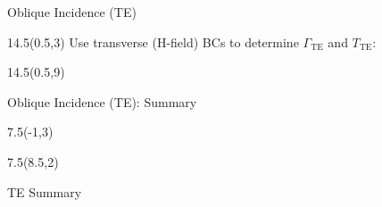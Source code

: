 \begin{frame}{Oblique Incidence (TE)}
\begin{textblock}{14.5}(0.5,3) 
Use transverse (H-field) BCs to determine $\Gamma_{\text{TE}}$ and $T_{\text{TE}}$:
\begin{small}
\end{small}
\end{textblock}

\begin{textblock}{14.5}(0.5,9) 
\begin{myblock}[0.9]{}
\vspace{-8pt}
\vspace{-16pt}
\end{myblock}
\end{textblock}

\end{frame}


\begin{frame}{Oblique Incidence (TE): Summary}
\begin{textblock}{7.5}(-1,3) 
\scalebox{0.75}{
	
}
\end{textblock}
\begin{textblock}{7.5}(8.5,2)
\begin{myblock}[0.95]{TE Summary}
\vspace{-12pt}
\end{myblock}
\end{textblock}
\end{frame}

